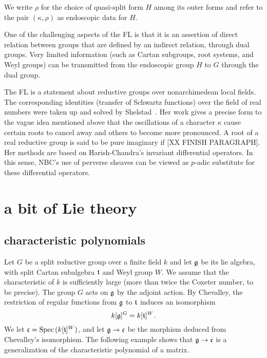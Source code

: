 \documentclass[brochure,english,12pt]{bourbaki}
\def\op#1{{\operatorname{#1}}}
\def\g{\frak{g}}
\def\t{\frak{t}}
\def\cc{\frak{c}}
\begin{document}
We write $\rho$ for the choice of quasi-split form $H$ among its outer forms and refer to
the pair $(\kappa,\rho)$ as endoscopic data for $H$.

One of the challenging aspects of the FL is that it is an assertion of
direct relation between groups that are defined by an indirect
relation, through dual groups.  Very limited information (such as
Cartan subgroups, root systems, and Weyl groups) can be transmitted
from the endoscopic group $H$ to $G$ through the dual group.

The FL is a statement about reductive groups over nonarchimedean local
fields.  The corresponding identities (transfer of Schwartz functions)
over the field of real numbers were taken up and solved by
Shelstad~\cite{XX}.  Her work gives a precise form to the vague idea
mentioned above that the oscillations of a character $\kappa$ cause
certain roots to cancel away and others to become more pronounced.  A
root of a real reductive group is said to be pure imaginary if [XX FINISH PARAGRAPH].   
Her
methods are based on Harish-Chandra's invariant differential
operators.  In this sense, NBC's use of perverse sheaves can be viewed
as $p$-adic substitute for these differential operators.



\section{a bit of Lie theory}



\subsection{characteristic polynomials}\label{sec:chevalley}



Let $G$ be a split reductive group over a finite field $k$ and let
$\g$ be its lie algebra, with split Cartan subalgebra $\t$ and Weyl
group $W$.  We assume that the characteristic of $k$ is sufficiently
large (more than twice the Coxeter number, to be precise).  The group
$G$ acts on $\g$ by the adjoint action.  By Chevalley,  the restriction  of regular
functions from $\g$ to $\t$ induces an isomorphism
\[
k[\g]^G = k[\t]^W.
\]
We let $\cc =  \op{Spec}\,(k[\t]^W)$, and let $\g\to\cc$ be the morphism deduced from
Chevalley's isomorphism.  The following example shows that $\g\to\cc$ is a generalization
of the characteristic polynomial of a matrix.
\end{document}
